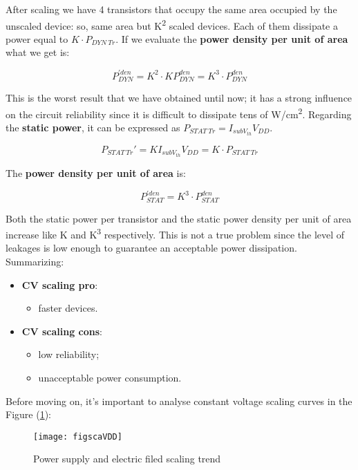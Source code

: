 \documentclass[a4paper, 12pt, twoside, openright]{report}
\newcommand{\super}{\textsuperscript}
\begin{document}
\begin{enumerate}
After scaling we have 4 transistors that occupy the same area occupied by the unscaled device: so, same area but K\super{2} scaled devices. Each of them dissipate a power equal to $K \cdot P_{DYN \ Tr}$. If we evaluate the \textbf{power density per unit of area} what we get is:

	\begin{equation}
	P^{'den}_{DYN} = K^2 \cdot KP_{DYN}^{den} = K^3 \cdot P^{den}_{DYN}
	\end{equation}

This is the worst result that we have obtained until now; it has a strong influence on the circuit reliability since it is difficult to dissipate tens of W/cm\super{2}.
Regarding the \textbf{static power}, it can be expressed as $P_{STAT \ Tr} = I_{subV_{th}} V_{DD}$.

	\begin{equation}
	P_{STAT \ Tr}' = K I_{subV_{th}} V_{DD} = K \cdot P_{STAT \ Tr}
	\end{equation}

The \textbf{power density per unit of area} is:

	\begin{equation}
	P^{'den}_{STAT} = K^3 \cdot P^{den}_{STAT}
	\end{equation}

Both the static power per transistor and the static power density per unit of area increase like K and K\super{3} respectively. This is not a true problem since the level of leakages is low enough to guarantee an acceptable power dissipation.
Summarizing:

\begin{itemize}
\item \textbf{CV scaling pro}:
	\begin{itemize}
	\item faster devices.
	\end{itemize}

\item \textbf{CV scaling cons}:
	\begin{itemize}
	\item low reliability;
	\item unacceptable power consumption.
	\end{itemize}
\end{itemize}

Before moving on, it's important to analyse constant voltage scaling curves in the Figure (\ref{curves}):

	\begin{figure}[H]
	\centering
	\texttt{[image: figscaVDD]}
	\caption{Power supply and electric filed scaling trend}
	\label{curves}
	\end{figure}


\end{enumerate}
\end{document}
